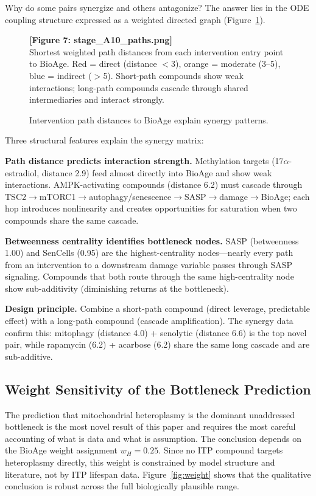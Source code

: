 \documentclass[11pt]{article}
\begin{document}
Why do some pairs synergize and others antagonize? The answer lies in the ODE coupling structure expressed as a weighted directed graph (Figure~\ref{fig:paths}).

\begin{figure}[ht]
\centering
\textbf{[Figure 7: stage\_A10\_paths.png]}\\[4pt]
\small Shortest weighted path distances from each intervention entry point to BioAge. Red = direct (distance $<$3), orange = moderate (3--5), blue = indirect ($>$5). Short-path compounds show weak interactions; long-path compounds cascade through shared intermediaries and interact strongly.
\caption{Intervention path distances to BioAge explain synergy patterns.}
\label{fig:paths}
\end{figure}

Three structural features explain the synergy matrix:

\textbf{Path distance predicts interaction strength.} Methylation targets (17$\alpha$-estradiol, distance 2.9) feed almost directly into BioAge and show weak interactions. AMPK-activating compounds (distance 6.2) must cascade through TSC2$\to$mTORC1$\to$autophagy/senescence$\to$SASP$\to$damage$\to$BioAge; each hop introduces nonlinearity and creates opportunities for saturation when two compounds share the same cascade.

\textbf{Betweenness centrality identifies bottleneck nodes.} SASP (betweenness 1.00) and SenCells (0.95) are the highest-centrality nodes---nearly every path from an intervention to a downstream damage variable passes through SASP signaling. Compounds that both route through the same high-centrality node show sub-additivity (diminishing returns at the bottleneck).

\textbf{Design principle.} Combine a short-path compound (direct leverage, predictable effect) with a long-path compound (cascade amplification). The synergy data confirm this: mitophagy (distance 4.0) + senolytic (distance 6.6) is the top novel pair, while rapamycin (6.2) + acarbose (6.2) share the same long cascade and are sub-additive.

\subsection{Weight Sensitivity of the Bottleneck Prediction}

The prediction that mitochondrial heteroplasmy is the dominant unaddressed bottleneck is the most novel result of this paper and requires the most careful accounting of what is data and what is assumption. The conclusion depends on the BioAge weight assignment $w_H = 0.25$. Since no ITP compound targets heteroplasmy directly, this weight is constrained by model structure and literature, not by ITP lifespan data. Figure~\ref{fig:weight} shows that the qualitative conclusion is robust across the full biologically plausible range.
\end{document}
